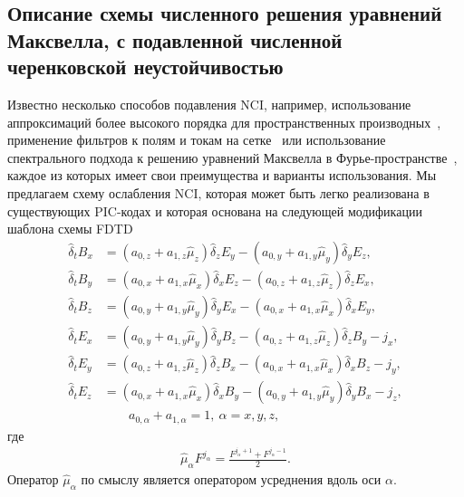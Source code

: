 \subsection{Описание схемы численного решения уравнений Максвелла, с подавленной численной черенковской неустойчивостью}
\label{sub:ch3/sec4/Hybrid}

Известно несколько способов подавления NCI, например, использование аппроксимаций более высокого порядка для пространственных производных~\cite{Lu2019, Xu2019, Li2020}, применение фильтров к полям и токам на сетке~\cite{greenwood2004elimination} или использование спектрального подхода к решению уравнений Максвелла в Фурье-пространстве~\cite{Yu2015}, каждое из которых имеет свои преимущества и варианты использования.
Мы предлагаем схему ослабления NCI, которая может быть легко реализована в существующих PIC-кодах и которая основана на следующей модификации шаблона схемы FDTD
\begin{align}
        \label{eq:ch3/scheme1}
        \hat{\delta}_t B_x&=(a_{0,z} + a_{1,z} \hat{\mu}_z)\hat{\delta}_z E_y - (a_{0,y} + a_{1,y} \hat{\mu}_y)\hat{\delta}_y E_z  ,\\
        \label{eq:ch3/scheme2}
        \hat{\delta}_t B_y&=(a_{0,x} + a_{1,x} \hat{\mu}_x)\hat{\delta}_x E_z - (a_{0,z} + a_{1,z} \hat{\mu}_z)\hat{\delta}_z E_x  ,\\
        \label{eq:ch3/scheme3}
        \hat{\delta}_t B_z&=(a_{0,y} + a_{1,y} \hat{\mu}_y)\hat{\delta}_y E_x - (a_{0,x} + a_{1,x} \hat{\mu}_x)\hat{\delta}_x E_y   ,\\
        \label{eq:ch3/scheme4}
        \hat{\delta}_t E_x&=(a_{0,y} + a_{1,y} \hat{\mu}_y)\hat{\delta}_y B_z - (a_{0,z} + a_{1,z} \hat{\mu}_z)\hat{\delta}_z B_y-j_x ,\\
        \label{eq:ch3/scheme5}
        \hat{\delta}_t E_y&=(a_{0,z} + a_{1,z} \hat{\mu}_z)\hat{\delta}_z B_x - (a_{0,x} + a_{1,x} \hat{\mu}_x)\hat{\delta}_x B_z-j_y ,\\
        \label{eq:ch3/scheme6}
        \hat{\delta}_t E_z&=(a_{0,x} + a_{1,x} \hat{\mu}_x)\hat{\delta}_x B_y - (a_{0,y} + a_{1,y} \hat{\mu}_y)\hat{\delta}_y B_x-j_z ,\\
    \label{eq:ch3/sec4/fp-stencil}
    {}&{}\qquad a_{0,\alpha}+a_{1,\alpha}=1,\ \alpha=x,y,z,
\end{align}
где
\begin{align}
    \hat{\mu}_\alpha F^{j_\alpha} = \frac{F^{j_\alpha+1}+F^{j_\alpha-1}}{2}.
\end{align}
Оператор $\hat{\mu}_\alpha$ по смыслу является оператором усреднения вдоль оси $\alpha$.
